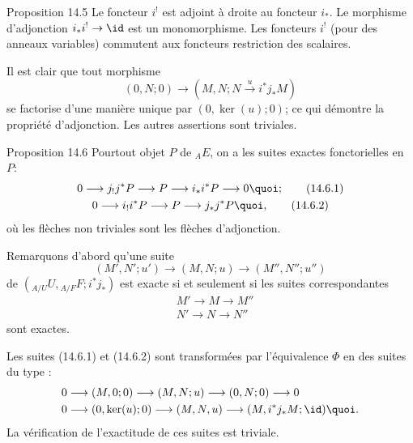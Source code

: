 \begin{enonce*}{Proposition 14.5}
Le foncteur $i^{!}$ est adjoint à droite au foncteur $i_{\ast}$. Le
morphisme d'adjonction $i_{\ast}i^{!}\rightarrow \id$ est un
monomorphisme. Les foncteurs $i^{!}$ (pour des anneaux variables)
commutent aux foncteurs restriction des scalaires.
\end{enonce*}

Il est clair que tout morphisme
$$
(0,N;0)\longrightarrow (M,N;N\xrightarrow{u}i^{\ast}j_{\ast}M)
$$
se factorise d'une manière unique par $(0,\ker(u);0)$; ce qui
démontre la propriété d'adjonction. Les autres assertions sont
triviales.

\begin{enonce*}{Proposition 14.6}
Pour\pageoriginale tout objet $P$ de ${}_AE$, on a les suites
exactes fonctorielles en $P$:
\begin{gather}
0\longrightarrow j_{!}j^{\ast}P\longrightarrow P\longrightarrow
i_{\ast}i^{\ast}P\longrightarrow 0{\quoi};\tag{14.6.1}\\
0\longrightarrow i_{!}i^{\ast}P\longrightarrow P\longrightarrow
j_{\ast}j^{\ast}P{\quoi},\tag{14.6.2}
\end{gather}
où les flèches non triviales sont les flèches d'adjonction.
\end{enonce*}

Remarquons d'abord qu'une suite
$$
(M', N'; u')\longrightarrow (M,N;u)\longrightarrow (M'',N'';u'')
$$
de $({}_{A/U}U, {}_{A/F}F; i^{\ast}j_{\ast})$ est exacte si et
seulement si les suites correspondantes
\begin{align*}
& M'\longrightarrow M\longrightarrow M''\\
& N'\longrightarrow N\longrightarrow N''
\end{align*}
sont exactes.

Les suites (14.6.1) et (14.6.2) sont transformées par
l'équivalence $\Phi$ en des suites du type :
\begin{align*}
& 0\longrightarrow (M,0;0)\longrightarrow (M,N;u)\longrightarrow
(0,N;0)\longrightarrow 0\\
& 0\longrightarrow (0,\ker(u);0)\longrightarrow
(M,N,u)\longrightarrow (M,i^{\ast}j_{\ast}M; \id){\quoi}.
\end{align*}
La vérification de l'exactitude de ces suites est triviale.

\setcounter{subsection}{6}
